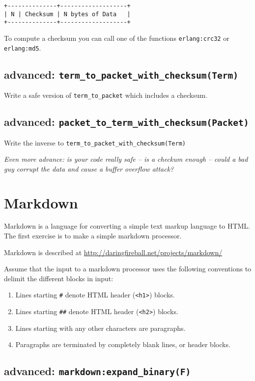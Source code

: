 ﻿\documentclass[12pt]{hitec}
\begin{document}
\begin{verbatim}
+--------------+-------------------+
| N | Checksum | N bytes of Data   |
+--------------+-------------------+
\end{verbatim}

To compute a checksum you can call one of the functions
\verb+erlang:crc32+ or \verb+erlang:md5+.


\subsection{advanced: \texttt{term\_to\_packet\_with\_checksum(Term)}}
Write a safe version of \verb+term_to_packet+ which includes a checksum.

\subsection{advanced: \texttt{packet\_to\_term\_with\_checksum(Packet)}}
Write the inverse to \verb+term_to_packet_with_checksum(Term)+

{\sl Even more advance: is your code really safe -- is a checkum
  enough -- could a bad guy corrupt the data and cause a buffer
  overflow attack?}

\section{Markdown}

Markdown is a language for converting a simple text markup language
to HTML. The first exercise is to make a simple markdown processor.

Markdown is described at
\url{http://daringfireball.net/projects/markdown/}

Assume that the input to a markdown processor uses the following
conventions to delimit the different blocks in input:

\begin{enumerate}
\item Lines starting \verb+#+ denote HTML header (\verb+<h1>+) blocks.
\item Lines starting \verb+##+ denote HTML header (\verb+<h2>+) blocks.
\item Lines starting with any other characters are paragraphs.
\item Paragraphs are terminated by completely blank lines, or header blocks.
\end{enumerate}

\subsection{advanced: \texttt{markdown:expand\_binary(F)}}
\end{document}
